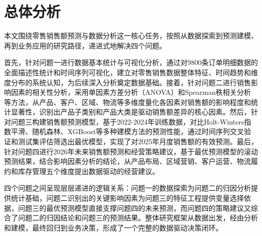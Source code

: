

\section{总体分析}

本文围绕零售销售额预测与数据分析这一核心任务，按照从数据探索到预测建模、再到业务应用的研究路径，递进式地解决四个问题。

首先，针对问题一进行数据基本统计与可视化分析，通过对9800条订单明细数据的全面描述性统计和时间序列可视化，建立对零售销售数据整体特征、时间趋势和维度分布的系统认知，为后续深入分析奠定数据基础。接着，针对问题二进行销售影响因素的相关性分析，采用单因素方差分析（ANOVA）和Spearman秩相关分析等方法，从产品、客户、区域、物流等多维度量化各因素对销售额的影响程度和统计显著性，识别出产品子类别和产品大类是驱动销售额差异的核心因素。然后，针对问题三构建销售额预测模型，基于2022-2024年训练数据，对比Holt-Winters指数平滑、随机森林、XGBoost等多种建模方法的预测性能，通过时间序列交叉验证和测试集评估筛选出最优模型，实现了对2025年月度销售额的有效预测。最后，针对问题四进行2026年未来销售额预测和经营策略建议，基于最优预测模型的滚动预测结果，结合影响因素分析的结论，从产品布局、区域营销、客户运营、物流履约和库存管理五个维度提出数据驱动的经营建议。

四个问题之间呈现层层递进的逻辑关系：问题一的数据探索为问题二的归因分析提供统计基础，问题二识别出的关键影响因素为问题三的特征工程提供变量选择依据，问题三的最优预测模型直接支撑问题四的未来预测，而问题四的策略建议又综合了问题二的归因结论和问题三的预测结果。整体研究框架从数据出发，经由分析和建模，最终回归到业务决策，形成了一个完整的数据驱动决策闭环。

